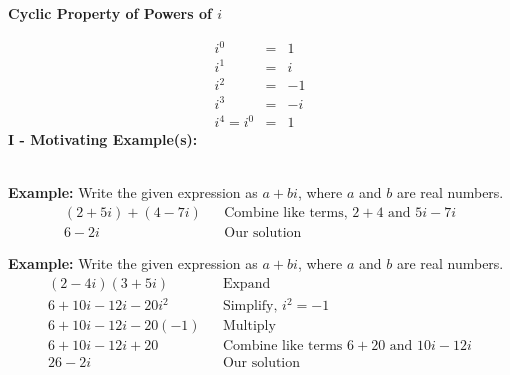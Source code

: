 \documentclass[12pt]{article}
\theoremstyle{definition}
\begin{document}
\begin{center}
  {\bf Cyclic Property of Powers of $i$}
\end{center}
\[ \begin{array}{rcc}
     i^0 &=& 1\\
     i^1 &=& i\\
     i^2 &=& - 1\\
     i^3 &=& - i\\
		 i^4=i^0&=&1
   \end{array} \]
{\bf I - Motivating Example(s):}\\
\ \par
{\bf Example:} Write the given expression as $a+bi$, where $a$ and $b$ are real numbers.
  \begin{eqnarray*}
    (2 + 5 i) + (4 - 7 i) &  & \text{Combine \ like \ terms, \ } 2 + 4
    \text{ \ and \ } 5 i - 7 i\\
    6 - 2 i &  & \text{Our \ solution}
  \end{eqnarray*}

{\bf Example:} Write the given expression as $a+bi$, where $a$ and $b$ are real numbers.
  \begin{eqnarray*}
    (2 - 4 i) (3 + 5 i) &  & \text{Expand}\\
    6 + 10 i - 12 i - 20 i^2 &  & \text{Simplify, \ } i^2 = - 1\\
    6 + 10 i - 12 i - 20 (- 1) &  & \text{Multiply}\\
    6 + 10 i - 12 i + 20 &  & \text{Combine \ like \ terms \ } 6 + 20
    \text{ \ and \ } 10 i - 12 i\\
    26 - 2 i &  & \text{Our \ solution}
  \end{eqnarray*}
\end{document}
